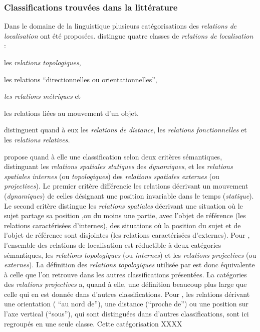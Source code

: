 \subsubsection{Classifications trouvées dans la littérature}




Dans le domaine de la linguistique plusieurs catégorisations des
\emph{relations de localisation} ont été
proposées. \textcite{Pustejovsky2017} distingue quatre classes de
\emph{relations de localisation} :
%
\begin{enumerate*}[label=(\alph*)]
\item les \emph{relations topologiques},
  \item les relations \enquote{directionnelles ou
  orientationnelles},
  \item \emph{les relations métriques} et
  \item les relations liées au mouvement d'un objet.
\end{enumerate*}
%

\textcite{Bateman2010} distinguent quand à eux les \emph{relations de
  distance}, les \emph{relations fonctionnelles} et les
\emph{relations relatives.}

\textcite{Borillo1998} propose quand à elle une classification selon
deux critères sémantiques, distinguant les \emph{relations spatiales
  statiques} des \emph{dynamiques}, et les \emph{relations spatiales
  internes} (ou \emph{topologiques}) des \emph{relations spatiales
  externes} (ou \emph{projectives}). Le premier critère différencie
les relations décrivant un mouvement (\emph{dynamiques}) de celles
désignant une position invariable dans le temps (\emph{statique}). Le
second critère distingue les \emph{relations spatiales} décrivant une
situation où le sujet partage sa position ,ou du moins une partie,
avec l'objet de référence (\ie les relations caractérisées
d'internes), des situations où la position du sujet et de l'objet de
référence sont disjointes (\ie les relations caractérisées
d'externes). Pour \textcite{Borillo1998}, l'ensemble des relations de
localisation est réductible à deux catégories sémantiques, les
\emph{relations topologiques} (ou \emph{internes}) et les
\emph{relations projectives} (ou \emph{externes}). La définition des
\emph{relations topologiques} utilisée par \textcite{Borillo1998} est
donc équivalente à celle que l'on retrouve dans les autres
classifications présentées. La catégories des \emph{relations
  projectives} a, quand à elle, une définition beaucoup plus large que
celle qui en est donnée dans d'autres classifications. Pour
\textcite{Borillo1998}, les relations dérivant une orientation (\eg
\enquote{au nord de}), une distance (\eg \enquote{proche de}) ou une
position sur l'axe vertical (\eg \enquote{sous}), qui sont distinguées
dans d'autres classifications, sont ici regroupés en une seule classe.
% 
Cette catégorisation XXXX

